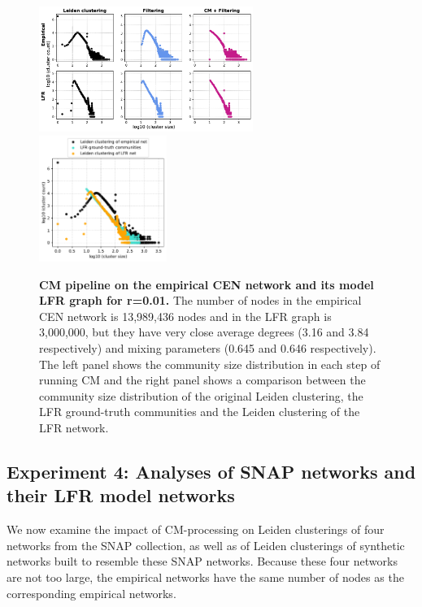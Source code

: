 \documentclass[11pt]{article}   	%
\begin{document}
\begin{figure}[h!]
\centering
\includegraphics[width=0.62\textwidth]{figs/cen_cm_steps_lfr01.pdf}
\includegraphics[width=0.37\textwidth]{figs/cen_01_cm_size.pdf}
\caption[CM pipeline on the empirical CEN network and its model LFR graph for r=0.01]{\textbf{CM pipeline on the empirical CEN network and its model LFR graph for r=0.01.} The number of nodes in the empirical CEN network is 13,989,436 nodes and in the LFR graph is 3,000,000, but they have very close average degrees (3.16 and 3.84 respectively) and mixing parameters (0.645 and 0.646 respectively). The left panel shows the community size distribution in each step of running CM and the right panel shows a comparison between the community size distribution of the original Leiden clustering, the LFR ground-truth communities and the Leiden clustering of the LFR network.}
\label{fig:cen-cm-lfr-01}
\end{figure}

\subsection{Experiment 4: Analyses of SNAP networks and their LFR model networks}

We now examine the impact of CM-processing on Leiden clusterings of four  networks from the SNAP collection, as well as of 
Leiden clusterings of synthetic networks built to resemble these SNAP networks.
Because these four networks are not too large, the empirical networks have the same number of nodes as the corresponding empirical networks.
\end{document}
